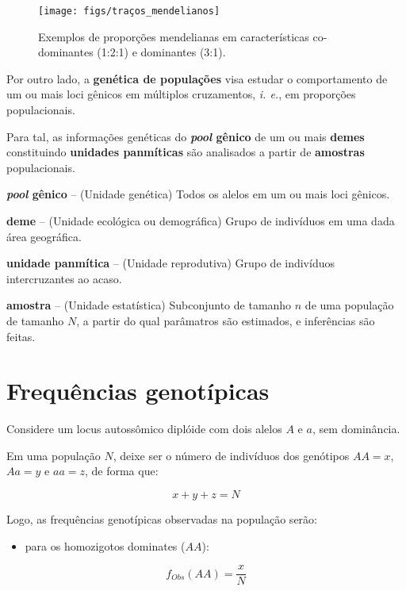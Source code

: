 \documentclass[
]{book}
\providecommand{\tightlist}{%
  \setlength{\itemsep}{0pt}\setlength{\parskip}{0pt}}
\begin{document}
\begin{figure}

{\centering \texttt{[image: figs/traços\_mendelianos]} 

}

\caption{Exemplos de proporções mendelianas em características co-dominantes (1:2:1) e dominantes (3:1).}\label{fig:mendeliano}
\end{figure}

Por outro lado, a \textbf{genética de populações} visa estudar o comportamento de um ou mais loci gênicos em múltiplos cruzamentos, \emph{i. e.}, em proporções populacionais.

Para tal, as informações genéticas do \textbf{\emph{pool} gênico} de um ou mais \textbf{demes} constituindo \textbf{unidades panmíticas} são analisados a partir de \textbf{amostras} populacionais.

\textbf{\emph{pool} gênico} -- (Unidade genética) Todos os alelos em um ou mais loci gênicos.

\textbf{deme} -- (Unidade ecológica ou demográfica) Grupo de indivíduos em uma dada área geográfica.

\textbf{unidade panmítica} -- (Unidade reprodutiva) Grupo de indivíduos intercruzantes ao acaso.

\textbf{amostra} -- (Unidade estatística) Subconjunto de tamanho \(n\) de uma população de tamanho \(N\), a partir do qual parâmatros são estimados, e inferências são feitas.

\hypertarget{frequuxeancias-genotuxedpicas}{%
\section{Frequências genotípicas}\label{frequuxeancias-genotuxedpicas}}

Considere um locus autossômico diplóide com dois alelos \(A\) e \(a\), sem dominância.

Em uma população \(N\), deixe ser o número de indivíduos dos genótipos \(AA = x\), \(Aa = y\) e \(aa = z\), de forma que:

\[x + y + z = N\]

Logo, as frequências genotípicas observadas na população serão:

\begin{itemize}
\tightlist
\item
  para os homozigotos dominates (\(AA\)):
\end{itemize}

\[f_{Obs}(AA) = \frac{x}{N}\]
\end{document}
